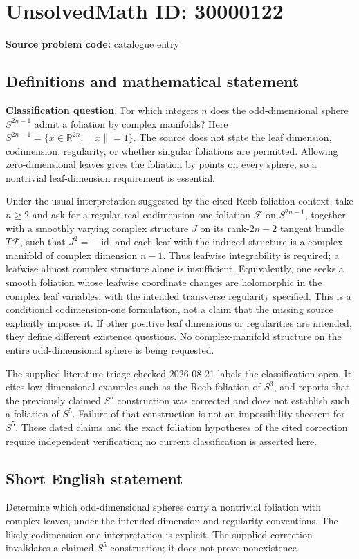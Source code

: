 \documentclass[11pt]{article}
\newcommand{\R}{\mathbb{R}}
\begin{document}
\section*{UnsolvedMath ID: 30000122}
\textbf{Source problem code:} catalogue entry
\subsection{Definitions and mathematical statement}
\textbf{Classification question.} For which integers \(n\) does the odd-dimensional sphere \(S^{2n-1}\) admit a foliation by complex manifolds? Here \(S^{2n-1}=\{x\in\R^{2n}:\|x\|=1\}\). The source does not state the leaf dimension, codimension, regularity, or whether singular foliations are permitted. Allowing zero-dimensional leaves gives the foliation by points on every sphere, so a nontrivial leaf-dimension requirement is essential.\par Under the usual interpretation suggested by the cited Reeb-foliation context, take \(n\ge2\) and ask for a regular real-codimension-one foliation \(\mathcal F\) on \(S^{2n-1}\), together with a smoothly varying complex structure \(J\) on its rank-\(2n-2\) tangent bundle \(T\mathcal F\), such that \(J^2=-\operatorname{id}\) and each leaf with the induced structure is a complex manifold of complex dimension \(n-1\). Thus leafwise integrability is required; a leafwise almost complex structure alone is insufficient. Equivalently, one seeks a smooth foliation whose leafwise coordinate changes are holomorphic in the complex leaf variables, with the intended transverse regularity specified. This is a conditional codimension-one formulation, not a claim that the missing source explicitly imposes it. If other positive leaf dimensions or regularities are intended, they define different existence questions. No complex-manifold structure on the entire odd-dimensional sphere is being requested.\par The supplied literature triage checked 2026-08-21 labels the classification open. It cites low-dimensional examples such as the Reeb foliation of \(S^3\), and reports that the previously claimed \(S^5\) construction was corrected and does not establish such a foliation of \(S^5\). Failure of that construction is not an impossibility theorem for \(S^5\). These dated claims and the exact foliation hypotheses of the cited correction require independent verification; no current classification is asserted here.
\subsection{Short English statement}
Determine which odd-dimensional spheres carry a nontrivial foliation with complex leaves, under the intended dimension and regularity conventions. The likely codimension-one interpretation is explicit. The supplied correction invalidates a claimed \(S^5\) construction; it does not prove nonexistence.
\end{document}
